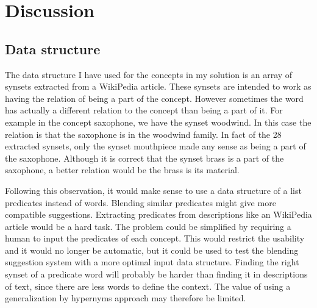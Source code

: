 
\chapter{Discussion} %

\label{Chapter8} %


\section{Data structure}
The data structure I have used for the concepts in my solution is an array of synsets extracted from a WikiPedia article. These synsets are intended to work as having the relation of being a part of the concept. However sometimes the word has actually a different relation to the concept than being a part of it. For example in the concept saxophone, we have the synset woodwind. In this case the relation is that the saxophone is in the woodwind family. In fact of the 28 extracted synsets, only the synset mouthpiece made any sense as being a part of the saxophone. Although it is correct that the synset brass is a part of the saxophone, a better relation would be the brass is its material.

Following this observation, it would make sense to use a data structure of a list predicates instead of words. Blending similar predicates might give more compatible suggestions. Extracting predicates from descriptions like an WikiPedia article would be a hard task. The problem could be simplified by requiring a human to input the predicates of each concept. This would restrict the usability and it would no longer be automatic, but it could be used to test the blending suggestion system with a more optimal input data structure. Finding the right synset of a predicate word will probably be harder than finding it in descriptions of text, since there are less words to define the context. The value of using a generalization by hypernyms approach may therefore be limited.



